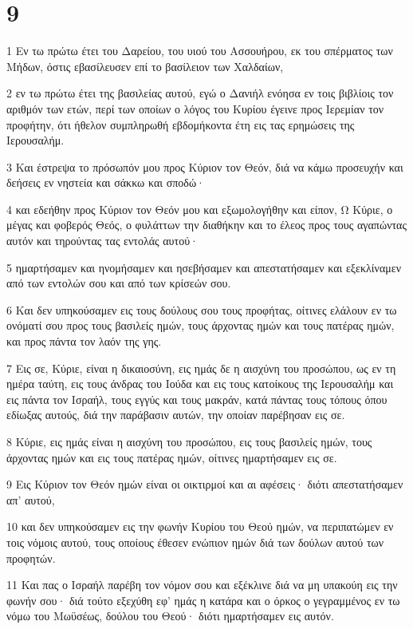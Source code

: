 \chapter{9}

\par 1 Εν τω πρώτω έτει του Δαρείου, του υιού του Ασσουήρου, εκ του σπέρματος των Μήδων, όστις εβασίλευσεν επί το βασίλειον των Χαλδαίων,
\par 2 εν τω πρώτω έτει της βασιλείας αυτού, εγώ ο Δανιήλ ενόησα εν τοις βιβλίοις τον αριθμόν των ετών, περί των οποίων ο λόγος του Κυρίου έγεινε προς Ιερεμίαν τον προφήτην, ότι ήθελον συμπληρωθή εβδομήκοντα έτη εις τας ερημώσεις της Ιερουσαλήμ.
\par 3 Και έστρεψα το πρόσωπόν μου προς Κύριον τον Θεόν, διά να κάμω προσευχήν και δεήσεις εν νηστεία και σάκκω και σποδώ·
\par 4 και εδεήθην προς Κύριον τον Θεόν μου και εξωμολογήθην και είπον, Ω Κύριε, ο μέγας και φοβερός Θεός, ο φυλάττων την διαθήκην και το έλεος προς τους αγαπώντας αυτόν και τηρούντας τας εντολάς αυτού·
\par 5 ημαρτήσαμεν και ηνομήσαμεν και ησεβήσαμεν και απεστατήσαμεν και εξεκλίναμεν από των εντολών σου και από των κρίσεών σου.
\par 6 Και δεν υπηκούσαμεν εις τους δούλους σου τους προφήτας, οίτινες ελάλουν εν τω ονόματί σου προς τους βασιλείς ημών, τους άρχοντας ημών και τους πατέρας ημών, και προς πάντα τον λαόν της γης.
\par 7 Εις σε, Κύριε, είναι η δικαιοσύνη, εις ημάς δε η αισχύνη του προσώπου, ως εν τη ημέρα ταύτη, εις τους άνδρας του Ιούδα και εις τους κατοίκους της Ιερουσαλήμ και εις πάντα τον Ισραήλ, τους εγγύς και τους μακράν, κατά πάντας τους τόπους όπου εδίωξας αυτούς, διά την παράβασιν αυτών, την οποίαν παρέβησαν εις σε.
\par 8 Κύριε, εις ημάς είναι η αισχύνη του προσώπου, εις τους βασιλείς ημών, τους άρχοντας ημών και εις τους πατέρας ημών, οίτινες ημαρτήσαμεν εις σε.
\par 9 Εις Κύριον τον Θεόν ημών είναι οι οικτιρμοί και αι αφέσεις· διότι απεστατήσαμεν απ' αυτού,
\par 10 και δεν υπηκούσαμεν εις την φωνήν Κυρίου του Θεού ημών, να περιπατώμεν εν τοις νόμοις αυτού, τους οποίους έθεσεν ενώπιον ημών διά των δούλων αυτού των προφητών.
\par 11 Και πας ο Ισραήλ παρέβη τον νόμον σου και εξέκλινε διά να μη υπακούη εις την φωνήν σου· διά τούτο εξεχύθη εφ' ημάς η κατάρα και ο όρκος ο γεγραμμένος εν τω νόμω του Μωϋσέως, δούλου του Θεού· διότι ημαρτήσαμεν εις αυτόν.
